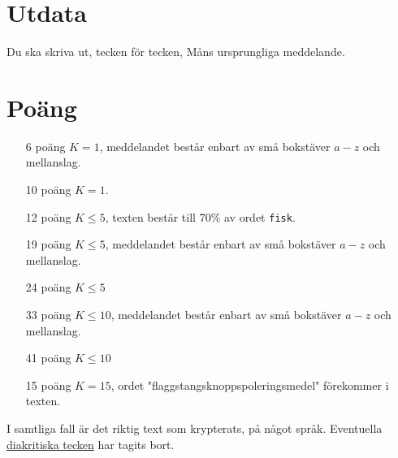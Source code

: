 \section*{Utdata}
Du ska skriva ut, tecken för tecken, Måns ursprungliga meddelande.

\section*{Poäng}

\begin{enumerate}
	\item[6 poäng] $K = 1$, meddelandet består enbart av små bokstäver $a-z$ och mellanslag.
	\item[10 poäng] $K = 1$.
  \item[12 poäng] $K \le 5$, texten består till 70\% av ordet \texttt{fisk}.
	\item[19 poäng] $K \le 5$, meddelandet består enbart av små bokstäver $a-z$ och mellanslag.
  \item[24 poäng] $K \le 5$
	\item[33 poäng] $K \le 10$, meddelandet består enbart av små bokstäver $a-z$ och mellanslag.
  \item[41 poäng] $K \le 10$
	\item[15 poäng] $K = 15$, ordet "flaggstangsknoppspoleringsmedel" förekommer i texten.
\end{enumerate}

I samtliga fall är det riktig text som krypterats, på något språk. Eventuella \href{https://sv.wikipedia.org/wiki/Diakritiskt\_tecken}{diakritiska tecken} har tagits bort.
